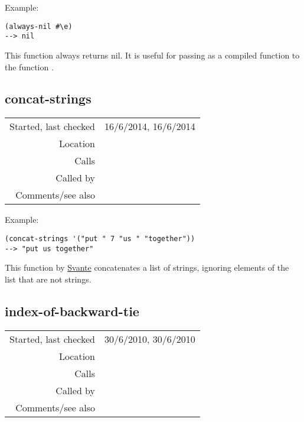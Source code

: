 \vspace{0.5cm}
\noindent Example:
\begin{verbatim}
(always-nil #\e)
--> nil
\end{verbatim}

\noindent This function always returns nil. It is
useful for passing as a compiled function to the
function .


\subsection*{concat-strings}\label{fun:concat-strings}

\vspace{0.3cm}
\begin{tabular}{r|p{8cm}}
Started, last checked & 16/6/2014, 16/6/2014 \\
Location & \nameref{sec:kern} \\
Calls & \\
Called by & \nameref{fun:followed-by-splitter} \\
Comments/see also & \nameref{fun:space-bar-separated-string2list}
\end{tabular}

\vspace{0.5cm}
\noindent Example:
\begin{verbatim}
(concat-strings '("put " 7 "us " "together"))
--> "put us together"
\end{verbatim}

\noindent This function by \href{http://stackoverflow.com/questions/5457346/lisp-function-to-concatenate-a-list-of-strings
}{Svante} concatenates a list of strings, ignoring
elements of the list that are not strings.


\subsection*{index-of-backward-tie}\label{fun:index-of-backward-tie}

\vspace{0.3cm}
\begin{tabular}{r|p{8cm}}
Started, last checked & 30/6/2010, 30/6/2010 \\
Location & \nameref{sec:kern} \\
Calls & \\
Called by & \nameref{fun:resolve-ties-kern} \\
Comments/see also &
\end{tabular}

